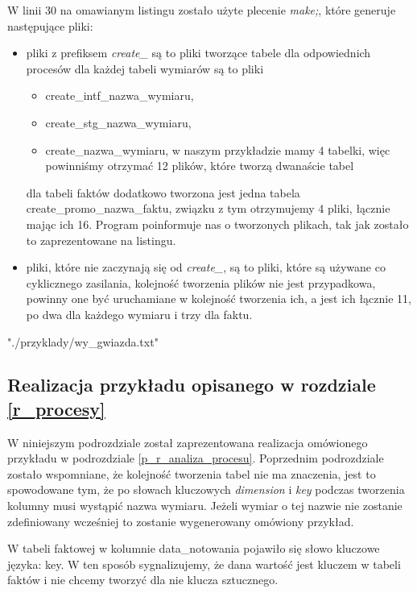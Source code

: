 W linii 30 na omawianym listingu zostało użyte plecenie \textit{make;},
 które generuje następujące pliki:
  \begin{itemize}
   \item 
      pliki z prefiksem \textit{create\_} są to pliki tworzące tabele dla odpowiednich procesów
      dla każdej tabeli wymiarów są to pliki 
        \begin{itemize}
         \item  create\_intf\_nazwa\_wymiaru,
         \item  create\_stg\_nazwa\_wymiaru,
         \item  create\_nazwa\_wymiaru,
      w naszym przykładzie mamy 4 tabelki, więc powinniśmy otrzymać 12 plików, które tworzą dwanaście tabel
        \end{itemize}
      dla tabeli faktów dodatkowo tworzona jest jedna tabela create\_promo\_nazwa\_faktu,
      związku z tym otrzymujemy 4 pliki,
      łącznie mając ich 16. Program poinformuje nas o tworzonych plikach,
      tak jak zostało to zaprezentowane na listingu.
   \item 
      pliki, które nie zaczynają się od \textit{create\_},
      są to pliki, które są używane co cyklicznego zasilania,
      kolejność tworzenia plików nie jest przypadkowa,
      powinny one być uruchamiane w kolejność tworzenia ich,
      a jest ich łącznie 11, po dwa dla każdego wymiaru i trzy dla faktu.
  \end{itemize}


 {"./przyklady/wy_gwiazda.txt"}
\subsection{Realizacja przykładu opisanego w rozdziale \ref{r_procesy}  }

W niniejszym podrozdziale został zaprezentowana realizacja omówionego przykładu w podrozdziale \ref{p_r_analiza_procesu}.
Poprzednim podrozdziale zostało wspomniane, że kolejność tworzenia tabel nie ma znaczenia,
 jest to spowodowane tym, że po słowach kluczowych  \textit{dimension} i  \textit{key} 
 podczas tworzenia kolumny musi wystąpić nazwa wymiaru. 
Jeżeli wymiar o tej nazwie nie zostanie zdefiniowany wcześniej to zostanie wygenerowany omówiony przykład.

W tabeli faktowej w kolumnie data\_notowania pojawiło się słowo kluczowe języka: key.
W ten sposób sygnalizujemy,
 że dana wartość jest kluczem w tabeli faktów
 i nie chcemy tworzyć dla nie klucza sztucznego. 

